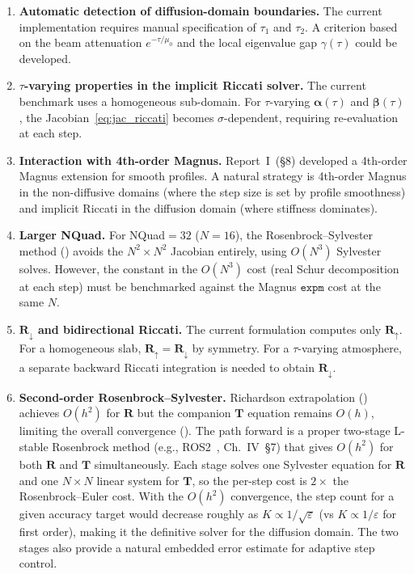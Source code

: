 \documentclass[11pt,a4paper]{article}
\newcommand{\mat}[1]{\mathbf{#1}}
\theoremstyle{definition}
\begin{document}
\begin{enumerate}
\item \textbf{Automatic detection of diffusion-domain boundaries.}
  The current implementation requires manual specification of
  $\tau_1$ and $\tau_2$.  A criterion based on the beam
  attenuation $e^{-\tau/\mu_0}$ and the local eigenvalue gap
  $\gamma(\tau)$ could be developed.

\item \textbf{$\tau$-varying properties in the implicit Riccati
  solver.}  The current benchmark uses a homogeneous sub-domain.
  For $\tau$-varying $\mat{\alpha}(\tau)$ and $\mat{\beta}(\tau)$,
  the Jacobian~\eqref{eq:jac_riccati} becomes $\sigma$-dependent,
  requiring re-evaluation at each step.

\item \textbf{Interaction with 4th-order Magnus.}
  Report~I~(\S8) developed a 4th-order Magnus extension for smooth
  profiles.  A natural strategy is 4th-order Magnus in the
  non-diffusive domains (where the step size is set by profile
  smoothness) and implicit Riccati in the diffusion domain (where
  stiffness dominates).

\item \textbf{Larger NQuad.}
  For NQuad${}=32$ ($N=16$), the Rosenbrock--Sylvester method
  () avoids the $N^2\!\times\!N^2$ Jacobian
  entirely, using $O(N^3)$ Sylvester solves.  However, the constant
  in the $O(N^3)$ cost (real Schur decomposition at each step)
  must be benchmarked against the Magnus $\texttt{expm}$ cost at
  the same $N$.

\item \textbf{$\mat{R}_\downarrow$ and bidirectional Riccati.}
  The current formulation computes only $\mat{R}_\uparrow$.  For a
  homogeneous slab, $\mat{R}_\uparrow=\mat{R}_\downarrow$ by
  symmetry.  For a $\tau$-varying atmosphere, a separate backward
  Riccati integration is needed to obtain $\mat{R}_\downarrow$.

\item \textbf{Second-order Rosenbrock--Sylvester.}
  Richardson extrapolation () achieves $O(h^2)$
  for $\mat{R}$ but the companion $\mat{T}$ equation remains $O(h)$,
  limiting the overall convergence ().  The
  path forward is a proper two-stage L-stable Rosenbrock method (e.g.,
  ROS2~\cite{hairer1996}, Ch.~IV~\S7) that gives $O(h^2)$ for both
  $\mat{R}$ and $\mat{T}$ simultaneously.  Each stage solves one
  Sylvester equation for $\mat{R}$ and one $N\!\times\!N$ linear
  system for $\mat{T}$, so the per-step cost is $2\times$ the
  Rosenbrock--Euler cost.  With the $O(h^2)$ convergence, the step
  count for a given accuracy target would decrease roughly as
  $K\propto 1/\sqrt{\varepsilon}$ (vs $K\propto 1/\varepsilon$ for
  first order), making it the definitive solver for the diffusion
  domain.  The two stages also provide a natural embedded error
  estimate for adaptive step control.


\end{enumerate}
\end{document}
